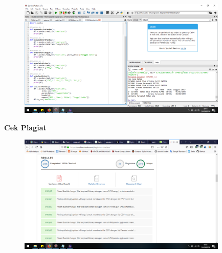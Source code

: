 \begin{figure}[H]
	\includegraphics[width=10cm]{figures/diva/Chapter4/harikedua/k5.png}
	\centering
\end{figure}

\textbf{Cek Plagiat}
\begin{figure}[H]
	\includegraphics[width=10cm]{figures/diva/Chapter4/harikedua/plagiatketrampilan.png}
	\centering
\end{figure}

